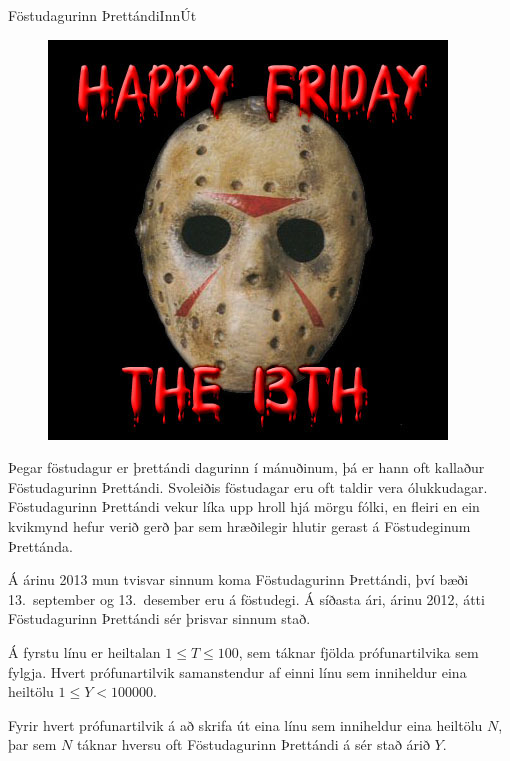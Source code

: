 \begin{problem}{Föstudagurinn Þrettándi}{Inn}{Út}{~}{~}

	\begin{figure}
		\vspace{-25pt}
		\begin{center}
			\includegraphics[scale=0.3]{../FostudagurinnThrettandi/friday13.jpg}
		\end{center}
		\vspace{-30pt}
	\end{figure}

	Þegar föstudagur er þrettándi dagurinn í mánuðinum, þá er hann oft kallaður Föstudagurinn Þrettándi. Svoleiðis föstudagar eru oft taldir vera ólukkudagar. Föstudagurinn Þrettándi vekur líka upp hroll hjá mörgu fólki, en fleiri en ein kvikmynd hefur verið gerð þar sem hræðilegir hlutir gerast á Föstudeginum Þrettánda.

	Á árinu 2013 mun tvisvar sinnum koma Föstudagurinn Þrettándi, því bæði 13.\ september og 13.\ desember eru á föstudegi. Á síðasta ári, árinu 2012, átti Föstudagurinn Þrettándi sér þrisvar sinnum stað.
	
	\Input

		Á fyrstu línu er heiltalan $1 \leq T \leq 100$, sem táknar fjölda prófunartilvika sem fylgja. Hvert prófunartilvik samanstendur af einni línu sem inniheldur eina heiltölu $1 \leq Y < 100000$.

	\Output

		Fyrir hvert prófunartilvik á að skrifa út eina línu sem inniheldur eina heiltölu $N$, þar sem $N$ táknar hversu oft Föstudagurinn Þrettándi á sér stað árið $Y$.


\end{problem}
